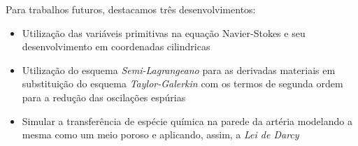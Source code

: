 \medskip
\noindent
Para trabalhos futuros, destacamos três desenvolvimentos:

\begin{itemize}
 \item Utilização das variáveis primitivas na equação Navier-Stokes
       e seu desenvolvimento em coordenadas cilindricas

 \item Utilização do esquema \textit{Semi-Lagrangeano} para as derivadas materiais
       em substituição do esquema \textit{Taylor-Galerkin} com os termos de segunda ordem
       para a redução das oscilações espúrias  

 \item Simular a transferência de espécie química na parede da artéria modelando
       a mesma como um meio poroso e aplicando, assim, a \textit{Lei de Darcy}
\end{itemize}

